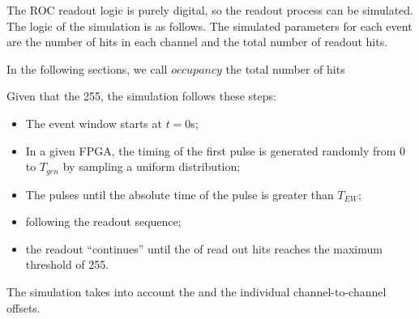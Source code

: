 The ROC readout logic is purely digital, so the readout process can be simulated. 
The logic of the simulation is as follows.
The simulated parameters for each event are the number of hits in each channel
and the total number of readout hits.

In the following sections, we call $occupancy$ the total number of hits

Given that the 
 255, the simulation follows these steps:
\begin{itemize}
\item
  The event window starts at $t=0$s;
\item
  In a given FPGA, the timing of the first pulse is generated randomly from 0 to $T_{gen}$
  by sampling a uniform distribution;
\item
  The  pulses 
   until the absolute time
  of the  pulse is greater than $T_{EW}$;
\item
   following the readout sequence;
\item
   the readout ``continues'' until 
  the  of read out hits reaches the maximum threshold of 255. 
\end{itemize}

The simulation  takes into account the 
 and the individual channel-to-channel  offsets. 

